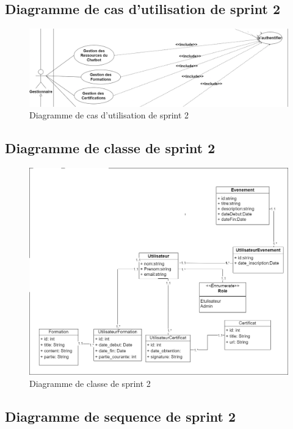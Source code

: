 \documentclass[a4paper, 11pt, openany]{report}
\begin{document}
\subsection{Diagramme de cas d'utilisation de sprint 2}


\begin{figure}[H]
\centering
\includegraphics[width=\textwidth]{assets/images/sprint2-usecase.png} 
\caption{Diagramme de cas d'utilisation de sprint 2}
\label{fig:s2_usecase}
\end{figure}

\subsection{Diagramme de classe de sprint 2}
\begin{figure}[H]
\centering
\includegraphics[width=\textwidth]{assets/images/sprint2-class.png} 
\caption{Diagramme de classe de sprint 2}
\label{fig:s2_class}
\end{figure}

\subsection{Diagramme de sequence de sprint 2}
\end{document}
